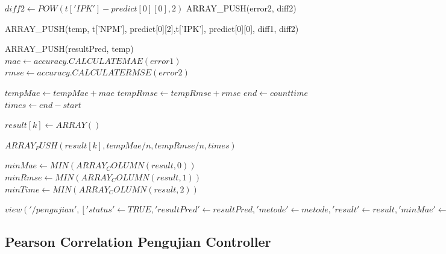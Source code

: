 \begin{enumerate}
\begin{algorithm}[H]
\begin{algorithmic}[1]
                                        \State $diff2 \gets POW(t['IPK'] - predict[0][0],2)$
                                        \State ARRAY\_PUSH(error2, diff2)
                                        
                                        \State ARRAY\_PUSH(temp, t['NPM'], predict[0][2],t['IPK'], predict[0][0], diff1, diff2)
                                        
                                        \State ARRAY\_PUSH(resultPred, temp)
                                    \EndIf
                                \EndIf
                            \EndFor
                                \State $mae \gets accuracy.CALCULATEMAE(error1)$
                                \State $rmse \gets accuracy.CALCULATERMSE(error2)$
                                
                                \State $tempMae \gets tempMae + mae$
                                \State $tempRmse \gets tempRmse + rmse$
                        \EndFor
                        \State $end \gets count time$
                        \State $times \gets end - start$
                        
                        \State $result[k] \gets ARRAY()$
                        
                        \State $ARRAY_PUSH(result[k], tempMae/n, tempRmse/n, times)$
                        
                   \EndFor
                   
                   \State $minMae \gets MIN(ARRAY_COLUMN(result,0))$
                   \State $minRmse \gets MIN(ARRAY_COLUMN(result,1))$
                   \State $minTime \gets MIN(ARRAY_COLUMN(result,2))$
                   
                   \State \Return $view('/pengujian', [
                        'status' \gets TRUE, 'resultPred' \gets resultPred, 'metode' \gets metode, 'result' \gets result, 'minMae' \gets minMae, 'minRmse' => minRmse, 'minTime' \gets minTime
                    ])$
                \EndProcedure
            \end{algorithmic} 
            \caption{Pengujian Kmeans}
            \label{alg:pengujianKmeans}
        \end{algorithm}

\end{enumerate}

\subsection{Pearson Correlation Pengujian Controller}
\label{subsec:pearson pengujian}

